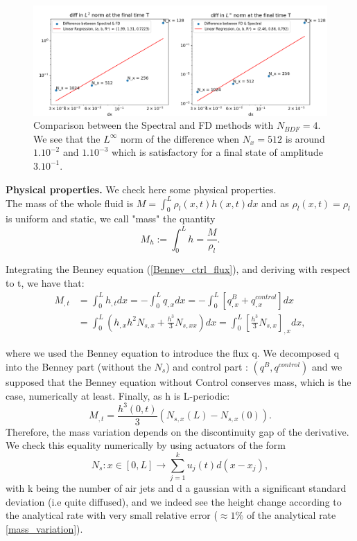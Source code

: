 \documentclass[12pt]{article}
\begin{document}
\begin{figure}
    \centering
    \includegraphics[width=1\linewidth]{Verif_scheme/Comparison_scheme_BDF4.png}
    \caption{Comparison between the Spectral and FD methods with $N_{BDF}=4.$ We see that the $L^{\infty}$ norm of the difference when $N_x=512$ is around $1.10^{-2}$ and $1.10^{-3}$ which is satisfactory for a final state of amplitude $3.10^{-1}$. }
    \label{fig:enter-label}
\end{figure}
\vspace{0.5cm}

\textbf{Physical properties.}
We check here some physical properties.
\\

The mass of the whole fluid is $M=\int_0^L\rho_l(x,t)h(x,t)dx$ and as $\rho_l(x,t)=\rho_l$ is uniform and static, we call "mass" the quantity 
\begin{equation}
M_h := \int_0^Lh = \frac{M}{\rho_l}.
\end{equation}

Integrating the Benney equation (\ref{Benney_ctrl_flux}), and deriving with respect to t, we have that: 
\begin{align*}
    M_{,t}&=\int_0^Lh_{,t}dx=-\int_0^L q_{,x}dx = -\int_0^L[q^B_{,x}+q^{control}_{,x}]dx \\ &= \int_0^L(h_{,x}h^2N_{s,x}+\frac{h^3}{3}N_{s,xx})dx=\int_0^L[\frac{h^3}{3}N_{s,x}]_{,x}dx ,
\end{align*}

where we used the Benney equation to introduce the flux q. We decomposed q into the Benney part (without the $N_s$) and control part : $(q^B, q^{control})$ and we supposed that the Benney equation without Control conserves mass, which is the case, numerically at least.
Finally, as h is L-periodic: 
\begin{equation}\label{mass_variation}
M_{,t} = \frac{h^3(0,t)}{3}(N_{s,x}(L)-N_{s,x}(0)).
\end{equation}
Therefore, the mass variation depends on the discontinuity gap of the derivative. 
We check this equality numerically by using actuators of the form $$N_s: x\in [0,L] \rightarrow \sum_{j=1}^{k}u_j(t)d(x-x_j),$$ with k being the number of air jets and d a gaussian with a significant standard deviation (i.e quite diffused), and we indeed see the height change according to the analytical rate with very small relative error ($\approx 1\%$ of the analytical rate \eqref{mass_variation}).  
\\
\end{document}
